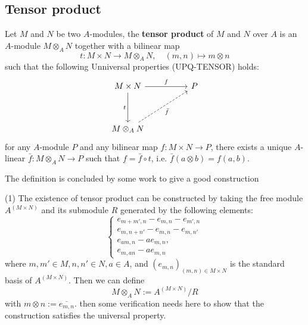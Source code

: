 \subsection{Tensor product}

\begin{definition}
    Let \(M\) and \(N\) be two \(A\)-modules, the \textbf{tensor product} of \(M\) and \(N\) over \(A\) is an \(A\)-module \(M \otimes_A N\) together with a bilinear map
    \[t : M \times N \to M \otimes_A N, \quad (m,n) \mapsto m \otimes n\]
    such that the following Unniversal properties (UPQ-TENSOR) holds:
\[\begin{tikzcd}
	{M \times N} && P \\
	\\
	{M\otimes_AN}
	\arrow["f", from=1-1, to=1-3]
	\arrow["t"', from=1-1, to=3-1]
	\arrow["{\bar{f}}"', dashed, from=3-1, to=1-3]
\end{tikzcd}\]
    for any \(A\)-module \(P\) and any bilinear map \(f: M \times N \to P\), there exists a unique \(A\)-linear \(\bar{f}: M \otimes_A N \to P\) such that \(f = \bar{f} \circ t\), i.e. \(\bar{f}(a \otimes b) = f(a,b)\).
\end{definition}

    The definition is concluded by some work to give a good construction

    (1) The existence of tensor product can be constructed by taking the free module \(A^{(M\times N)}\) and its submodule \(R\) generated by the following elements:
    \[\begin{cases}
        e_{m+m',n}-e_{m,n}-e_{m',n} \\
        e_{m,n+n'}-e_{m,n}-e_{m,n'} \\
        e_{am,n}-a e_{m,n}, \\
        e_{m,an}-a e_{m,n}
    \end{cases}\]
    where \(m,m' \in M, n,n' \in N, a \in A\), and \((e_{m,n})_{(m,n)\in M\times N}\) is the standard basis of \(A^{(M\times N)}\). Then we can define
    \[M \otimes_A N := A^{(M\times N)}/R\]
    with \(m\otimes n:=\overline{e_{m,n}}\). then some verification needs here to show that the construction satisfies the universal property.\\

